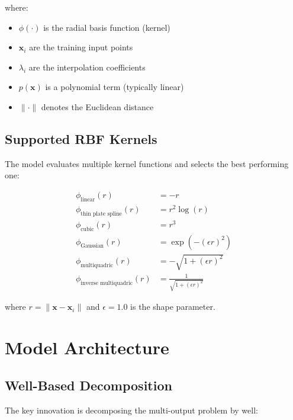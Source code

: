 \documentclass[11pt]{article}
\begin{document}
where:
\begin{itemize}
    \item $\phi(\cdot)$ is the radial basis function (kernel)
    \item $\mathbf{x}_i$ are the training input points
    \item $\lambda_i$ are the interpolation coefficients
    \item $p(\mathbf{x})$ is a polynomial term (typically linear)
    \item $\|\cdot\|$ denotes the Euclidean distance
\end{itemize}

\subsection{Supported RBF Kernels}

The model evaluates multiple kernel functions and selects the best performing one:

\begin{align}
\phi_{\text{linear}}(r) &= -r \\
\phi_{\text{thin plate spline}}(r) &= r^2 \log(r) \\
\phi_{\text{cubic}}(r) &= r^3 \\
\phi_{\text{Gaussian}}(r) &= \exp(-(\epsilon r)^2) \\
\phi_{\text{multiquadric}}(r) &= -\sqrt{1 + (\epsilon r)^2} \\
\phi_{\text{inverse multiquadric}}(r) &= \frac{1}{\sqrt{1 + (\epsilon r)^2}}
\end{align}

where $r = \|\mathbf{x} - \mathbf{x}_i\|$ and $\epsilon = 1.0$ is the shape parameter.

\section{Model Architecture}

\subsection{Well-Based Decomposition}

The key innovation is decomposing the multi-output problem by well:
\end{document}
